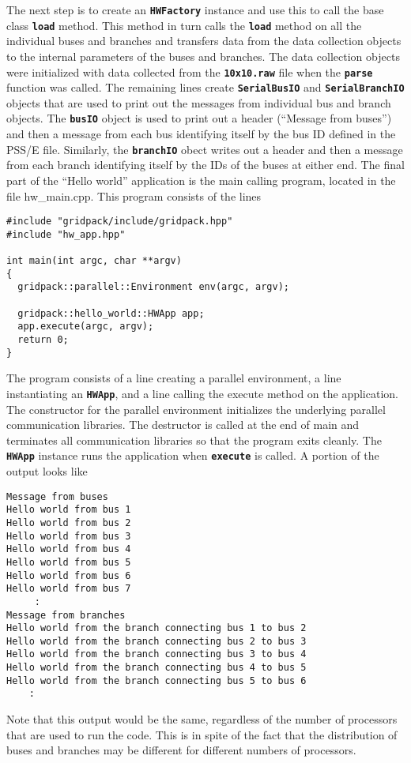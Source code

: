 The next step is to create an \texttt{\textbf{HWFactory}} instance and use this to call the base class \texttt{\textbf{load}} method. This method in turn calls the \texttt{\textbf{load}} method on all the individual buses and branches and transfers data from the data collection objects to the internal parameters of the buses and branches. The data collection objects were initialized with data collected from the \texttt{\textbf{10x10.raw}} file when the \texttt{\textbf{parse}} function was called. The remaining lines create \texttt{\textbf{SerialBusIO}} and \texttt{\textbf{SerialBranchIO}} objects that are used to print out the messages from individual bus and branch objects. The \texttt{\textbf{busIO}} object is used to print out a header (``Message from buses'') and then a message from each bus identifying itself by the bus ID defined in the PSS/E file. Similarly, the \texttt{\textbf{branchIO}} obect writes out a header and then a message from each branch identifying itself by the IDs of the buses at either end.
The final part of the ``Hello world'' application is the main calling program, located in the file hw\_main.cpp. This program consists of the lines

{
\color{red}
\begin{Verbatim}[fontseries=b]
#include "gridpack/include/gridpack.hpp"
#include "hw_app.hpp"

int main(int argc, char **argv)
{
  gridpack::parallel::Environment env(argc, argv);

  gridpack::hello_world::HWApp app;
  app.execute(argc, argv);
  return 0;
}
\end{Verbatim}
}

The program consists of a line creating a parallel environment, a line instantiating an \texttt{\textbf{HWApp}}, and a line calling the execute method on the application. The constructor for the parallel environment initializes the underlying parallel communication libraries. The destructor is called at the end of main and terminates all communication libraries so that the program exits cleanly. The \texttt{\textbf{HWApp}} instance runs the application when \texttt{\textbf{execute}} is called. A portion of the output looks like

{
\color{red}
\begin{Verbatim}[fontseries=b]
Message from buses
Hello world from bus 1
Hello world from bus 2
Hello world from bus 3
Hello world from bus 4
Hello world from bus 5
Hello world from bus 6
Hello world from bus 7
     :
Message from branches
Hello world from the branch connecting bus 1 to bus 2
Hello world from the branch connecting bus 2 to bus 3
Hello world from the branch connecting bus 3 to bus 4
Hello world from the branch connecting bus 4 to bus 5
Hello world from the branch connecting bus 5 to bus 6
    :
\end{Verbatim}
}

Note that this output would be the same, regardless of the number of processors that are used to run the code. This is in spite of the fact that the distribution of buses and branches may be different for different numbers of processors.
